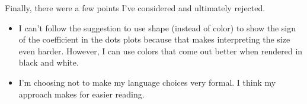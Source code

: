 \documentclass[12pt,letterpaper,oneside]{article}
\begin{document}
\pagebreak

Finally, there were a few points I've considered and ultimately rejected.
\begin{itemize}
    \item I can't follow the suggestion to use shape (instead of color) to show the sign of the coefficient in the dots plots because that makes interpreting the size even harder. However, I can use colors that come out better when rendered in black and white.
    \item I'm choosing not to make my language choices very formal. I think my approach makes for easier reading.
\end{itemize}
\end{document}
